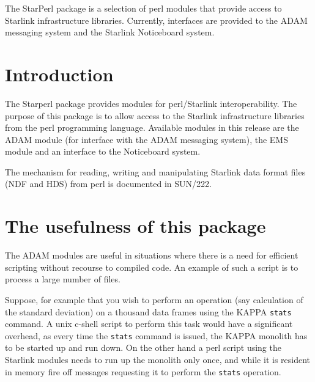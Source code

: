 \documentclass[twoside,11pt]{article}
\newcommand{\stardocinitials}  {SUN}
\newcommand{\stardocnumber}    {228.2}
\newcommand{\stardocabstract}  {The StarPerl package is a selection
of perl modules that provide access to Starlink infrastructure libraries.
Currently, interfaces are provided to the ADAM messaging system and
the Starlink Noticeboard system.
}
\newcommand{\stardocname}{\stardocinitials /\stardocnumber}
\newenvironment{latexonly}{}{}
\newcommand{\xref}[3]{#1}
\renewcommand{\_}{\texttt{\symbol{95}}}
\renewcommand{\thepage}{\roman{page}}
\begin{document}
\stardocabstract
  \newpage
  \begin{latexonly}
    \setlength{\parskip}{0mm}
    \tableofcontents
    \setlength{\parskip}{\medskipamount}
    \markboth{\stardocname}{\stardocname}
  \end{latexonly}
\cleardoublepage
\renewcommand{\thepage}{\arabic{page}}
\setcounter{page}{1}


\section{Introduction}

The Starperl package provides modules for perl/Starlink interoperability. The
purpose of this package is to allow access to the Starlink infrastructure
libraries from the \xref{perl}{sun193}{} programming language. Available
modules in this release are the ADAM module (for interface with the ADAM
messaging system), the EMS module and an interface to the Noticeboard system.

The mechanism for reading, writing and manipulating Starlink data format files
(NDF and HDS) from perl is documented in \xref{SUN/222}{sun222}{}.

\section{The usefulness of this package\label{stats}}

The ADAM  modules are useful in situations where there is a need for
efficient scripting without recourse to compiled code. An example of
such a script is to process a large number of files.

Suppose, for example that you wish to perform an operation (say calculation of
the standard deviation) on a thousand data frames using the
\xref{KAPPA}{sun95}{} \xref{\texttt{stats}}{sun95}{STATS} command. A unix
c-shell script to perform this task would have a significant overhead, as
every time the \texttt{stats} command is issued, the \xref{KAPPA}{sun95}{}
monolith has to be started up and run down. On the other hand a perl script
using the Starlink modules needs to run up the monolith only once, and while
it is resident in memory fire off messages requesting it to perform the
\xref{\texttt{stats}}{sun95}{STATS} operation.
\end{document}
